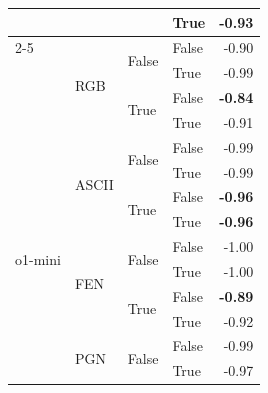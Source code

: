 \documentclass{article}
\begin{document}
\begin{table}
\begin{center}
{\begin{tabular}{@{}llllr@{}}
                                    &                           &                           & True                      & -0.93 \\
    \cmidrule{2-5}
                                    & \multirow[c]{4}{*}{RGB}   & \multirow[c]{2}{*}{False} & False                     & -0.90 \\
                                    &                           &                           & True                      & -0.99 \\
                                    &                           & \multirow[c]{2}{*}{True}  & False                     & \textbf{-0.84} \\
                                    &                           &                           & True                      & -0.91 \\
    \midrule
    \multirow[c]{13}{*}{o1-mini}    & \multirow[c]{4}{*}{ASCII} & \multirow[c]{2}{*}{False} & False                     & -0.99 \\
                                    &                           &                           & True                      & -0.99 \\
                                    &                           & \multirow[c]{2}{*}{True}  & False                     & \textbf{-0.96} \\
                                    &                           &                           & True                      & \textbf{-0.96} \\
    \cmidrule{2-5}
                                    & \multirow[c]{4}{*}{FEN}   & \multirow[c]{2}{*}{False} & False                     & -1.00 \\
                                    &                           &                           & True                      & -1.00 \\
                                    &                           & \multirow[c]{2}{*}{True}  & False                     & \textbf{-0.89} \\
                                    &                           &                           & True                      & -0.92 \\
    \cmidrule{2-5}
                                    & \multirow[c]{4}{*}{PGN}   & \multirow[c]{2}{*}{False} & False                     & -0.99 \\
                                    &                           &                           & True                      & -0.97 \\

\end{tabular}}
\end{center}
\end{table}
\end{document}
